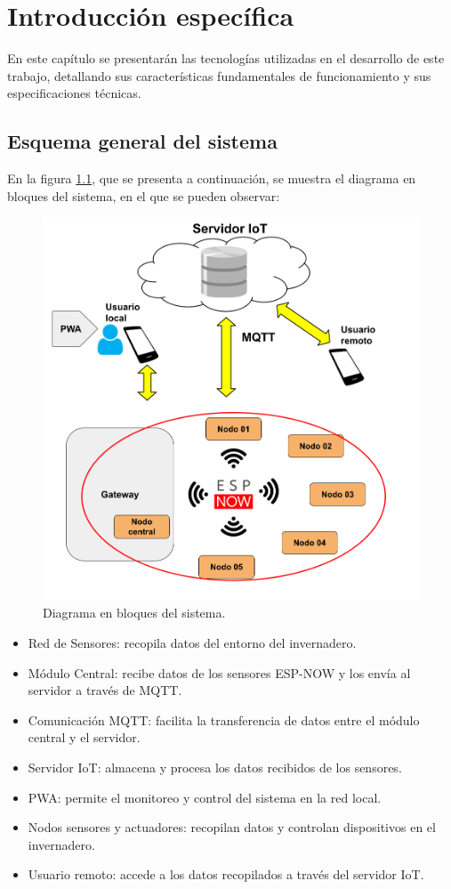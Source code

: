 \chapter{Introducción específica} %

\label{Chapter2}

En este capítulo se presentarán las tecnologías utilizadas en el desarrollo de este trabajo, detallando sus características fundamentales de funcionamiento y sus especificaciones técnicas.

\section{Esquema general del sistema}

En la figura \ref{fig:diagBloques}, que se presenta a continuación, se muestra el diagrama en bloques del sistema, en el que se pueden observar:
\begin{figure}[htpb]
\centering 
\includegraphics[width=.6\textwidth]{./Figures/Diagrama_bloques.png}
\caption{Diagrama en bloques del sistema.}
\label{fig:diagBloques}
\end{figure}

\begin{itemize}
	\item Red de Sensores: recopila datos del entorno del invernadero.
	\item Módulo Central: recibe datos de los sensores ESP-NOW y los envía al servidor a través de MQTT.
	\item Comunicación MQTT: facilita la transferencia de datos entre el módulo central y el servidor.
	\item Servidor IoT: almacena y procesa los datos recibidos de los sensores.
	\item PWA: permite el monitoreo y control del sistema en la red local.
	\item Nodos sensores y actuadores: recopilan datos y controlan dispositivos en el invernadero.
	\item Usuario remoto: accede a los datos recopilados a través del servidor IoT.
\end{itemize}



